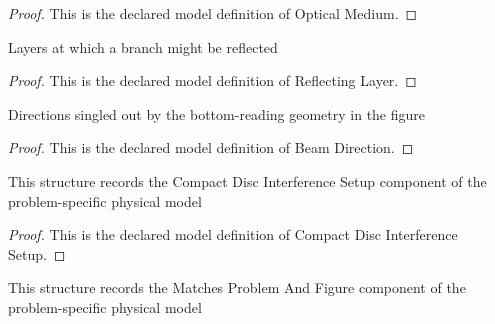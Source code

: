 \begin{proof}
  This is the declared model definition of Optical Medium.
\end{proof}
\begin{definition}
  \label{def:physics:phyx-mini-0116:phyxminiproblems-problemphyxmini0116-reflectinglayer}
  Layers at which a branch might be reflected
\end{definition}
\begin{proof}
  This is the declared model definition of Reflecting Layer.
\end{proof}
\begin{definition}
  \label{def:physics:phyx-mini-0116:phyxminiproblems-problemphyxmini0116-beamdirection}
  Directions singled out by the bottom-reading geometry in the figure
\end{definition}
\begin{proof}
  This is the declared model definition of Beam Direction.
\end{proof}
\begin{definition}
  \label{def:physics:phyx-mini-0116:phyxminiproblems-problemphyxmini0116-compactdiscinterferencesetup}
  This structure records the Compact Disc Interference Setup component of the problem-specific physical model
\end{definition}
\begin{proof}
  This is the declared model definition of Compact Disc Interference Setup.
\end{proof}
\begin{definition}
  \label{def:physics:phyx-mini-0116:phyxminiproblems-problemphyxmini0116-matchesproblemandfigure}
  This structure records the Matches Problem And Figure component of the problem-specific physical model
\end{definition}
